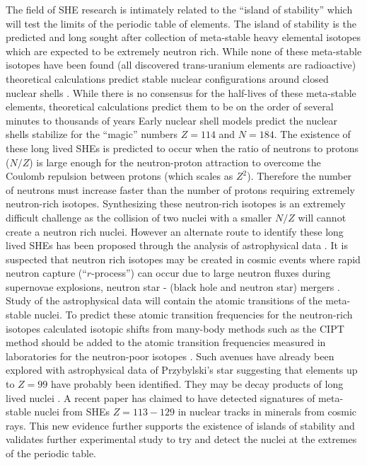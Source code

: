 \documentclass[10pt,a4paper, twoside, openright]{report}
\begin{document}
The field of SHE research is intimately related to the ``island of stability''  which will test the limits of the periodic table of elements. The island of stability is the predicted and long sought after collection of meta-stable heavy elemental isotopes which are expected to be extremely neutron rich. While none of these meta-stable isotopes have been found (all discovered trans-uranium elements are radioactive) theoretical calculations predict stable nuclear configurations around closed nuclear shells \cite{Myers1966, Sobiczewski1966, Nilsson1969SHE, Nix1972}. While there is no consensus for the half-lives of these meta-stable elements, theoretical calculations predict them to be on the order of several minutes to thousands of years \cite{Oganessian2017} Early nuclear shell models predict the nuclear shells stabilize for the ``magic'' numbers $Z=114$ and $N=184$\cite{OUL2004, HHO2013, Leino2016, Oganessian2012}. The existence of these long lived SHEs is predicted to occur when the ratio of neutrons to protons ($N/Z$) is large enough for the neutron-proton attraction to overcome  the Coulomb repulsion between protons (which scales as $Z^2$). Therefore the number of neutrons must increase faster than the number of protons requiring extremely neutron-rich isotopes. Synthesizing these neutron-rich isotopes is an extremely difficult challenge as the collision of two nuclei with a smaller $N/Z$ will cannot create a neutron rich nuclei. However an alternate route to identify these long lived SHEs has been proposed through the analysis of astrophysical data \cite{DFW17, Akopian2015}. It is suspected that neutron rich isotopes may be created in cosmic events where rapid neutron capture (``$r$-process'') can occur due to large neutron fluxes during supernovae explosions, neutron star - (black hole and neutron star) mergers \cite{Goriely2011, Fuller2017, Friebel2018, Schuetrumpf2015}. Study of the astrophysical data will contain the atomic transitions of the meta-stable nuclei. To predict these atomic transition frequencies for the neutron-rich isotopes calculated isotopic shifts from many-body methods such as the CIPT method should be added to the atomic transition frequencies measured in laboratories for the neutron-poor isotopes \cite{DFW17}. Such avenues have already been explored with astrophysical data of  Przybylski's star suggesting that elements up to $Z=99$ have probably  been identified\cite{Polukhina2012, Gopka2008, Fivet2007}.  They may be decay products of long lived nuclei \cite{DFW17}. A recent paper \cite{Alexandrov2019} has claimed to  have detected signatures of meta-stable nuclei from SHEs $Z=113-129$ in nuclear tracks in minerals from cosmic rays. This new evidence further supports the existence of islands of stability and validates further experimental study to try and detect the nuclei at the extremes of the periodic table.\\
\end{document}
